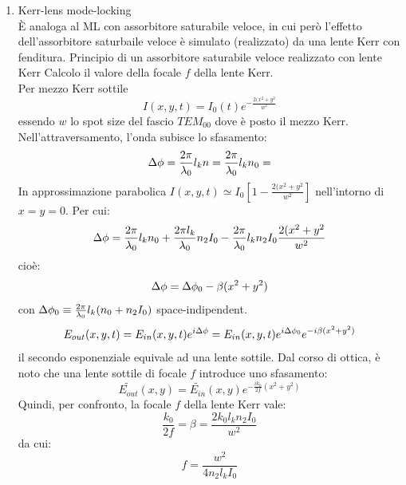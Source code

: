 \begin{enumerate}
\item Kerr-lens mode-locking\\
È analoga al ML con assorbitore saturabile veloce, in cui però l'effetto dell'assorbitore saturbaile veloce è simulato (realizzato) da una lente Kerr con fenditura. Principio di un assorbitore saturabile veloce realizzato con lente Kerr
Calcolo il valore della focale $f$ della lente Kerr.\\
Per mezzo Kerr sottile
\begin{equation*}
I(x,y,t) = I_0(t) e^{-\frac{2(x^2 + y^2}{w^2}}
\end{equation*}
essendo $w$ lo spot size del fascio $TEM_{00}$ dove è posto il mezzo Kerr. Nell'attraversamento, l'onda subisce lo sfasamento:
\begin{equation*}
\Delta\phi = \frac{2\pi}{\lambda_0} l_k n = \frac{2\pi}{\lambda_0} l_k n_0 =
\end{equation*}
In approssimazione parabolica
$I(x,y,t) \simeq I_0 \left[1 - \frac{2(x^2 + y^2}{w^2}\right]$ nell'intorno di $x=y=0$.
Per cui:
\begin{equation*}
\Delta\phi = \frac{2\pi}{\lambda_0} l_k n_0 + \frac{2\pi l_k}{\lambda_0}n_2I_0 - \frac{2\pi}{\lambda_0} l_kn_2I_0 \frac{2(x^2 + y^2}{w^2}
\end{equation*}
cioè:
\begin{equation*}
\Delta\phi = \Delta\phi_0 - \beta(x^2+y^2)
\end{equation*}
con $\Delta\phi_0 \equiv \frac{2\pi}{\lambda_0} l_k (n_0 + n_2I_0)$ space-indipendent.
\begin{equation*}
E_{out}(x,y,t) = E_{in}(x,y,t) e^{i\Delta\phi} = E_{in}(x,y,t)
e^{i\Delta\phi_0} e^{-i\beta(x^2+y^2)}
\end{equation*}
il secondo esponenziale equivale ad una lente sottile.
Dal corso di ottica, è noto che una lente sottile di focale $f$ introduce uno sfasamento:
\begin{equation*}
\tilde{E_{out}}(x,y) = \tilde{E_{in}}(x,y) e^{-\frac{ik_0}{2f}(x^2+y^2)}
\end{equation*}
Quindi, per confronto, la focale $f$ della lente Kerr vale:
\begin{equation*}
\frac{k_0}{2f} = \beta = \frac{2k_0 l_k n_2 I_0}{w^2}
\end{equation*}
da cui:
\begin{equation*}
f = \frac{w^2}{4 n_2 l_k I_0}
\end{equation*}

\end{enumerate}









